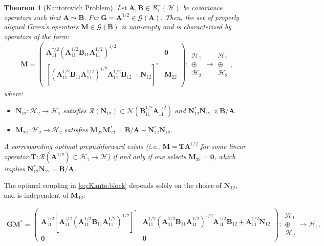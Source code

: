 \documentclass[noinfoline]{imsart}\setcounter{tocdepth}{2}
\newcommand{\m}[1]{\mathbf{#1}}
\renewcommand{\c}[1]{\mathcal{#1}}
\theoremstyle{plain}
\newtheorem{theorem}{Theorem}[section]
\begin{document}
\begin{theorem}[Kantorovich Problem]\label{thm:Kanto:char}
Let $\m{A}, \m{B} \in \c{B}_{1}^{+}(\c{H})$ be covariance operators such that $\m{A} \leadsto \m{B}$. Fix $\m{G} = \m{A}^{1/2} \in \c{G}(\m{A})$.
Then, the set of properly aligned Green's operators $\m{M} \in \c{G}(\m{B})$ is non-empty and is characterized by operators of the form:
\begin{align*}
    \m{M} =
    \begin{pmatrix}
    \m{A}_{{11}}^{\dagger/2} (\m{A}_{{11}}^{1/2} \m{B}_{{11}} \m{A}_{{11}}^{1/2})^{1/2} & \m{0} \\
    [(\m{A}_{{11}}^{1/2} \m{B}_{{11}} \m{A}_{{11}}^{1/2})^{\dagger/2} \m{A}_{{11}}^{1/2} \m{B}_{{12}} + \m{N}_{{12}}]^{*} & \m{M}_{{22}}
    \end{pmatrix}
        :
    \begin{array}{c}
    \c{H}_{1} \\
    \oplus \\
    \c{H}_{2}
    \end{array}
    \rightarrow
    \begin{array}{c}
    \c{H}_{1} \\
    \oplus \\
    \c{H}_{2}
    \end{array} ,
\end{align*}
where: 
\begin{itemize}[leftmargin = *]
    \item $\m{N}_{{12}}  : \c{H}_{2} \to \c{H}_{1}$ satisfies $\c{R}(\m{N}_{{12}}) \subset \c{N}(\m{B}_{{11}}^{1/2} \m{A}_{{11}}^{1/2})$ and $\m{N}_{{12}}^{*} \m{N}_{{12}} \preceq \m{B}/\m{A}$.
    \item $\m{M}_{{22}}  : \c{H}_{2} \to \c{H}_{2}$ satisfies $\m{M}_{{22}} \m{M}_{{22}}^{*} = \m{B}/\m{A} - \m{N}_{{12}}^{*} \m{N}_{{12}}$.
\end{itemize}
A corresponding optimal prepushforward exists (i.e., $\m{M} = \m{T}\m{A}^{1/2}$ for some linear operator $\m{T}: \c{R}(\m{A}^{1/2}) \subset \c{H}_{1} \rightarrow \c{H}$) if and only if one selects $\m{M}_{{22}} = \m{0}$, which implies $\m{N}_{{12}}^{*} \m{N}_{{12}} = \m{B}/\m{A}$.
\end{theorem}
The optimal coupling in \eqref{eq:Kanto:block} depends solely on the choice of $\m{N}_{{12}}$, and is independent of $\m{M}_{{12}}$:
\begin{small}
\begin{align*}
    \m{G} \m{M}^{*} = \begin{pmatrix}
    \m{A}_{{11}}^{1/2} [\m{A}_{{11}}^{\dagger/2} (\m{A}_{{11}}^{1/2} \m{B}_{{11}} \m{A}_{{11}}^{1/2})^{1/2}]^{*}  & \m{A}_{{11}}^{1/2} (\m{A}_{{11}}^{1/2} \m{B}_{{11}} \m{A}_{{11}}^{1/2})^{\dagger/2} \m{A}_{{11}}^{1/2} \m{B}_{{12}}  + \m{A}_{{11}}^{1/2} \m{N}_{{12}} \\
    \m{0} & \m{0}
    \end{pmatrix} :
    \begin{array}{c}
    \c{H}_{1} \\
    \oplus \\
    \c{H}_{2}
    \end{array}
    \rightarrow
    \c{H}_{1}.
\end{align*}
\end{small}
\end{document}
